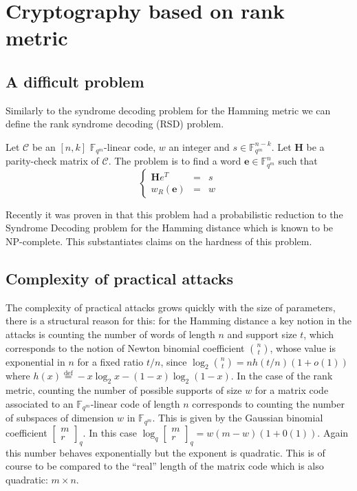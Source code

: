 \documentclass[11pt, a4paper]{llncs}
\newcommand{\eqdef}{\stackrel{\text{def}}{=}}
\newcommand{\Fqm}{\mathbb{F}_{q^m}}
\newcommand{\C}{\mathcal{C}}
\newcommand{\word}[1]{\ensuremath{\boldsymbol{#1}}}
\newcommand{\ev}{\word{e}}
\newcommand{\Hv}{\word{H}}
\begin{document}
\section{Cryptography based on rank metric}

\subsection{A difficult problem}

Similarly to the syndrome decoding problem for the Hamming metric we can define the rank syndrome
decoding  (RSD) problem.

\begin{problem} \label{prob:RSD}
Let $\C$ be an $[n, k]$  $\Fqm$-linear code, $w$ an
integer and $s \in \Fqm^{n-k}$. Let $\Hv$ be a parity-check matrix of $\C$. The problem is to find a word $\ev \in \Fqm^n$ such that
\[\left\lbrace\begin{array}{lcc}
\Hv e^T & = & s\\
w_R(\ev) & = & w
\end{array}\right. \]
\end{problem}

 Recently it was proven in \cite{GZ14} that this problem had a probabilistic
reduction to the Syndrome Decoding problem for the Hamming distance
which is known to be NP-complete.
This substantiates claims on the hardness of this problem.

\subsection{Complexity of practical attacks}

The complexity of practical attacks grows quickly with the size of parameters,
there is a structural reason for this: for the Hamming distance a key notion
in the attacks is counting the number of words of length $n$ and support size $t$,
which corresponds to the notion of Newton binomial coefficient $\binom{n}{t}$, 
whose value is exponential in $n$ for a fixed ratio $t/n$, since 
$\log_2 \binom{n}{t} = n h(t/n)(1+o(1))$ where $h(x) \eqdef - x \log_2 x -(1-x)\log_2(1-x)$.
 In the case of the rank metric, counting the number of possible supports of size
$w$ for a matrix code associated to an $\Fqm$-linear code of length $n$   corresponds to counting the number
of subspaces of dimension $w$ in $\Fqm$. This is given by   the Gaussian binomial coefficient
$\left[ \substack{m \\ r} \right]_q$. In this case $\log_q \left[ \substack{m \\ r} \right]_q
= w(m-w)(1+0(1))$. Again this number behaves exponentially but the exponent is quadratic.
This is of course to be compared to the ``real'' length of the matrix code which is also quadratic: $m \times n$.
\end{document}
